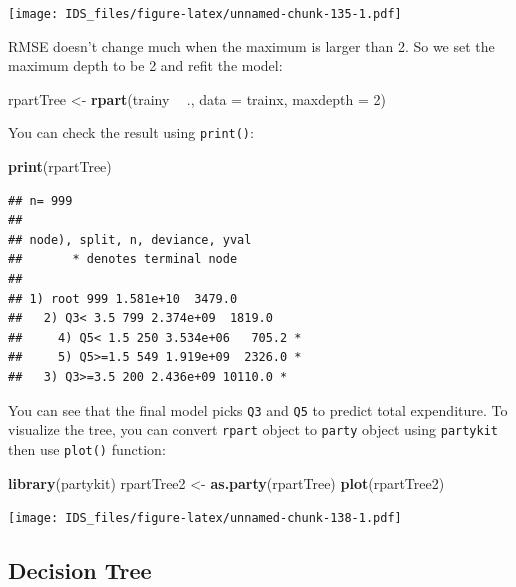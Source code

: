 \documentclass[12pt,]{krantz}
\makeatletter
\newenvironment{Shaded}{\begin{snugshade}}{\end{snugshade}}
\newcommand{\DataTypeTok}[1]{\textcolor[rgb]{0.27,0.27,0.27}{#1}}
\newcommand{\DecValTok}[1]{\textcolor[rgb]{0.06,0.06,0.06}{#1}}
\newcommand{\KeywordTok}[1]{\textcolor[rgb]{0.27,0.27,0.27}{\textbf{#1}}}
\newcommand{\NormalTok}[1]{#1}
\newcommand{\OperatorTok}[1]{\textcolor[rgb]{0.43,0.43,0.43}{\textbf{#1}}}
\newcommand{\StringTok}[1]{\textcolor[rgb]{0.5,0.5,0.5}{#1}}
\newenvironment{kframe}{%
\medskip{}
\setlength{\fboxsep}{.8em}
 \def\at@end@of@kframe{}%
 \ifinner\ifhmode%
  \def\at@end@of@kframe{\end{minipage}}%
  \begin{minipage}{\columnwidth}%
 \fi\fi%
 \def\FrameCommand##1{\hskip\@totalleftmargin \hskip-\fboxsep
 \colorbox{shadecolor}{##1}\hskip-\fboxsep
     \hskip-\linewidth \hskip-\@totalleftmargin \hskip\columnwidth}%
 \MakeFramed {\advance\hsize-\width
   \@totalleftmargin\z@ \linewidth\hsize
   \@setminipage}}%
 {\par\unskip\endMakeFramed%
 \at@end@of@kframe}
\renewenvironment{Shaded}{\begin{kframe}}{\end{kframe}}
\makeatother
\begin{document}
\texttt{[image: IDS\_files/figure-latex/unnamed-chunk-135-1.pdf]}

RMSE doesn't change much when the maximum is larger than 2. So we set the maximum depth to be 2 and refit the model:

\begin{Shaded}
\begin{Highlighting}[]
\NormalTok{rpartTree <-}\StringTok{ }\KeywordTok{rpart}\NormalTok{(trainy }\OperatorTok{~}\StringTok{ }\NormalTok{., }\DataTypeTok{data =}\NormalTok{ trainx, }\DataTypeTok{maxdepth =} \DecValTok{2}\NormalTok{)}
\end{Highlighting}
\end{Shaded}

You can check the result using \texttt{print()}:

\begin{Shaded}
\begin{Highlighting}[]
\KeywordTok{print}\NormalTok{(rpartTree)}
\end{Highlighting}
\end{Shaded}

\begin{verbatim}
## n= 999 
## 
## node), split, n, deviance, yval
##       * denotes terminal node
## 
## 1) root 999 1.581e+10  3479.0  
##   2) Q3< 3.5 799 2.374e+09  1819.0  
##     4) Q5< 1.5 250 3.534e+06   705.2 *
##     5) Q5>=1.5 549 1.919e+09  2326.0 *
##   3) Q3>=3.5 200 2.436e+09 10110.0 *
\end{verbatim}

You can see that the final model picks \texttt{Q3} and \texttt{Q5} to predict total expenditure. To visualize the tree, you can convert \texttt{rpart} object to \texttt{party} object using \texttt{partykit} then use \texttt{plot()} function:

\begin{Shaded}
\begin{Highlighting}[]
\KeywordTok{library}\NormalTok{(partykit)}
\NormalTok{rpartTree2 <-}\StringTok{ }\KeywordTok{as.party}\NormalTok{(rpartTree)}
\KeywordTok{plot}\NormalTok{(rpartTree2)}
\end{Highlighting}
\end{Shaded}

\texttt{[image: IDS\_files/figure-latex/unnamed-chunk-138-1.pdf]}

\hypertarget{decision-tree}{%
\subsection{Decision Tree}\label{decision-tree}}
\end{document}
